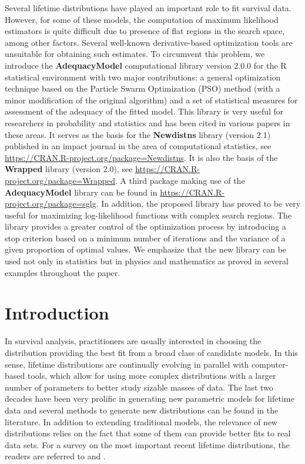 \documentclass[10pt,letterpaper]{article}
\begin{document}
Several lifetime distributions have  played an important role to fit survival data.
However, for some of these models,  the computation of maximum likelihood estimators is quite difficult due to presence of flat regions in the search space, among other factors.
Several well-known derivative-based optimization tools are unsuitable for obtaining such estimates.
To circumvent this problem, we introduce the \textbf{AdequacyModel} computational library version 2.0.0 for the \textsc{R} statistical environment
with two major contributions: a general optimization technique based on the Particle Swarm Optimization (PSO) method (with a minor modification of the original algorithm)
and a set of statistical measures for assessment of the adequacy of the fitted model.
This library is very useful for researchers in pro\-bability and statistics and has been cited in various papers in these areas.
It serves as the basis for the \textbf{Newdistns} library (version 2.1) published in an impact journal in the area of computational statistics,
see \url{https://CRAN.R-project.org/package=Newdistns}.
It is also the basis of the \textbf{Wrapped} library (version 2.0), see \url{https://CRAN.R-project.org/package=Wrapped}.
A third package  making use of the \textbf{AdequacyModel} library can be found in \url{https://CRAN.R-project.org/package=sglg}.
In addition, the proposed library has proved to be very useful for maximizing log-likelihood functions with complex search regions.
The library provides a greater control of the optimization process by introducing a stop criterion  based on a minimum number of iterations and the variance of a given proportion of optimal values.
We emphasize that the new library can be used not only in statistics but in physics and mathematics as proved in several examples throughout the paper.

\linenumbers

\section{Introduction}

In survival analysis, practitioners are usually interested in choosing the distribution  providing the best fit from a broad class of candidate models.
In this sense, lifetime distributions are continually evolving in parallel with computer-based tools, which allow for using more complex distributions
with a larger number of parameters to better study sizable masses of data.
The last two decades have been very prolific in generating new parametric models for lifetime data and several methods to generate new distributions can be found in the literature.
In addition to extending traditional models, the relevance of new distributions relies on the fact that some of them can provide better fits to real data sets.
For a survey on the most important recent lifetime distributions, the readers are referred to \cite{almalkinadarajah2014} and \cite{tahircordeiro2016}.
\end{document}
